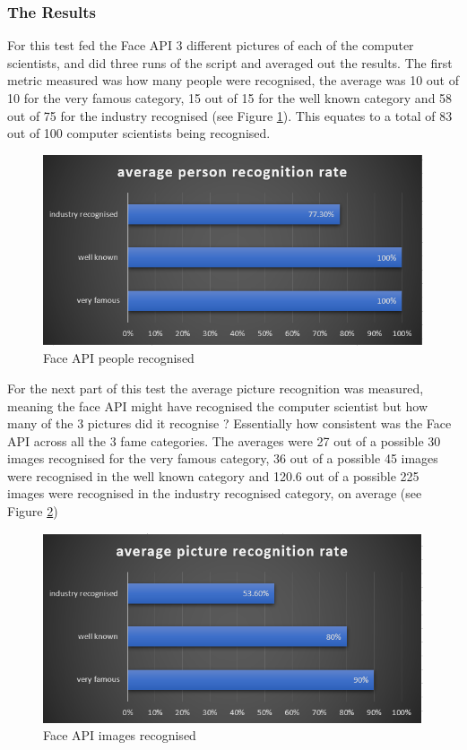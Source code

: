 \documentclass[12pt,a4paper]{article}
\begin{document}
\subsubsection{The Results}

For this test fed the Face API 3 different pictures of each of the computer scientists, and did three runs of the script and averaged out the results. The first metric measured was how many people were recognised, the average was 10 out of 10 for the very famous category, 15 out of 15 for the well known category and 58 out of 75 for the industry recognised (see Figure \ref{fer1}). This equates to a total of 83 out of 100 computer scientists being recognised. 

\begin{figure}[!ht]
    \centering
    \includegraphics[width=1.0\textwidth]{Figs/faceevalr1.PNG} 
    \caption{Face API people recognised} 
    \label{fer1}
\end{figure}

For the next part of this test the average picture recognition was measured, meaning the face API might have recognised the computer scientist but how many of the 3 pictures did it recognise ? Essentially how consistent was the Face API across all the 3 fame categories. The averages were 27 out of a possible 30 images recognised for the very famous category, 36 out of a possible 45 images were recognised in the well known category and 120.6 out of a possible 225 images were recognised in the industry recognised category, on average (see Figure \ref{fer2})  

\begin{figure}[!ht]
    \centering
    \includegraphics[width=1.0\textwidth]{Figs/faceevalr2.PNG} 
    \caption{Face API images recognised} 
    \label{fer2}
\end{figure}
\end{document}
